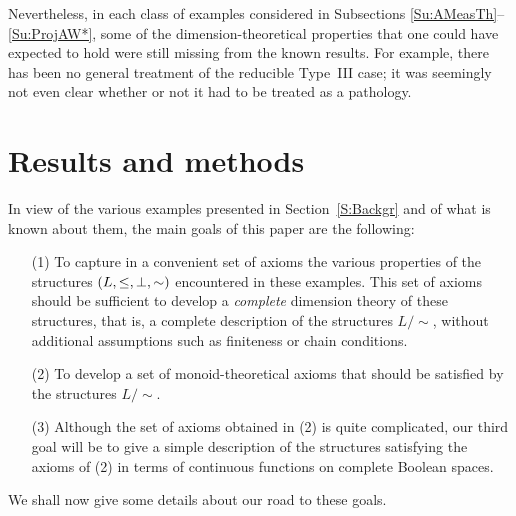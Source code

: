 \documentclass[psamsfonts,reqno]{memo-l}
\theoremstyle{plain}
\theoremstyle{definition}
\theoremstyle{remark}
\numberwithin{equation}{section}
\begin{document}
Nevertheless, in each class of examples considered in Subsections
\ref{Su:AMeasTh}--\ref{Su:ProjAW*}, some of the dimension-theoretical
properties that one could have expected to hold were still missing from the
known results. For example, there has been no general treatment of the
reducible Type~III case; it was seemingly not even clear whether or not it had
to be treated as a pathology.


\section{Results and methods}\label{S:ResMeth}

In view of the various examples presented in Section~\ref{S:Backgr} and of
what is known about them, the main goals of this paper are the
following:
\begin{itemize}
\item[(1)] To capture in a convenient set of axioms the various properties of
the structures $(L\nobreak,\leq\nobreak,\perp\nobreak,\sim\nobreak)$
encountered in these examples. This set of axioms should be sufficient to
develop a \emph{complete} dimension theory of these structures, that is, a
complete description of the structures $L/{\sim}$, without additional
assumptions such as finiteness or chain conditions.

\item[(2)] To develop a set of monoid-theoretical axioms that should be
satisfied by the structures $L/{\sim}$.

\item[(3)] Although the set of axioms obtained in (2) is quite complicated,
our third goal will be to give a simple description of the structures
satisfying the axioms of (2) in terms of continuous functions on complete
Boolean spaces.
\end{itemize}

We shall now give some details about our road to these goals.
\end{document}
